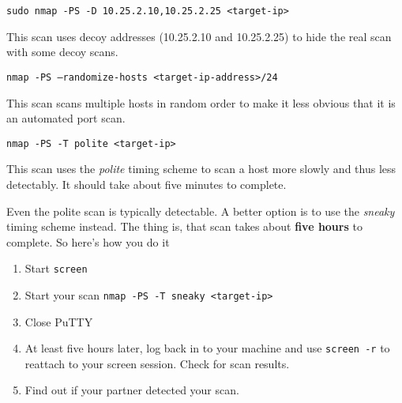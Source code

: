 \documentclass{article}
\begin{document}
\texttt{sudo nmap -PS -D 10.25.2.10,10.25.2.25 <target-ip>}

This scan uses decoy addresses (10.25.2.10 and 10.25.2.25) to hide the real scan with some decoy scans.

\texttt{nmap -PS --randomize-hosts <target-ip-address>/24 }

This scan scans multiple hosts in random order to make it less obvious that it is an automated port scan.

\texttt{nmap -PS -T polite <target-ip>}

This scan uses the \emph{polite} timing scheme to scan a host more slowly and thus less detectably.  It should take about five minutes to complete.

Even the polite scan is typically detectable. A better option is to use the \emph{sneaky} timing scheme instead.  The thing is, that scan takes about \textbf{five hours} to complete.  So here's how you do it

\begin{enumerate}
	\item Start \texttt{screen}
	\item Start your scan \texttt{nmap -PS -T sneaky <target-ip>}
	\item Close PuTTY
	\item At least five hours later, log back in to your machine and use \texttt{screen -r} to reattach to your screen session. Check for scan results.
	\item Find out if your partner detected your scan.
\end{enumerate}
\end{document}

